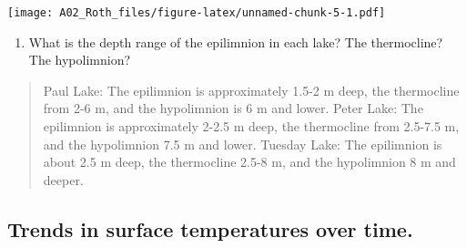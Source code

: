 \documentclass[]{article}
\newenvironment{Shaded}{\begin{snugshade}}{\end{snugshade}}
\newcommand{\CommentTok}[1]{\textcolor[rgb]{0.56,0.35,0.01}{\textit{#1}}}
\newcommand{\DataTypeTok}[1]{\textcolor[rgb]{0.13,0.29,0.53}{#1}}
\newcommand{\FloatTok}[1]{\textcolor[rgb]{0.00,0.00,0.81}{#1}}
\newcommand{\KeywordTok}[1]{\textcolor[rgb]{0.13,0.29,0.53}{\textbf{#1}}}
\newcommand{\NormalTok}[1]{#1}
\newcommand{\OperatorTok}[1]{\textcolor[rgb]{0.81,0.36,0.00}{\textbf{#1}}}
\newcommand{\StringTok}[1]{\textcolor[rgb]{0.31,0.60,0.02}{#1}}
\providecommand{\tightlist}{%
  \setlength{\itemsep}{0pt}\setlength{\parskip}{0pt}}
\begin{document}
\begin{Shaded}
\end{Shaded}

\texttt{[image: A02\_Roth\_files/figure-latex/unnamed-chunk-5-1.pdf]}

\begin{enumerate}
\def\labelenumi{\arabic{enumi}.}
\setcounter{enumi}{9}
\tightlist
\item
  What is the depth range of the epilimnion in each lake? The
  thermocline? The hypolimnion?
\end{enumerate}

\begin{quote}
Paul Lake: The epilimnion is approximately 1.5-2 m deep, the thermocline
from 2-6 m, and the hypolimnion is 6 m and lower. Peter Lake: The
epilimnion is approximately 2-2.5 m deep, the thermocline from 2.5-7.5
m, and the hypolimnion 7.5 m and lower. Tuesday Lake: The epilimnion is
about 2.5 m deep, the thermocline 2.5-8 m, and the hypolimnion 8 m and
deeper.
\end{quote}

\hypertarget{trends-in-surface-temperatures-over-time.}{%
\subsection{Trends in surface temperatures over
time.}\label{trends-in-surface-temperatures-over-time.}}
\end{document}
